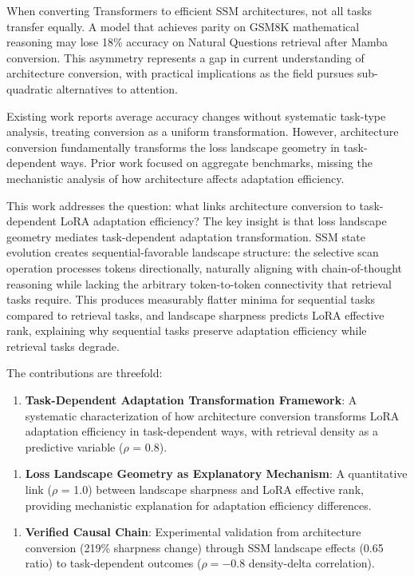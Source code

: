 
When converting Transformers to efficient SSM architectures, not all tasks transfer equally. A model that achieves parity on GSM8K mathematical reasoning may lose 18\% accuracy on Natural Questions retrieval after Mamba conversion. This asymmetry represents a gap in current understanding of architecture conversion, with practical implications as the field pursues sub-quadratic alternatives to attention.

Existing work reports average accuracy changes without systematic task-type analysis, treating conversion as a uniform transformation. However, architecture conversion fundamentally transforms the loss landscape geometry in task-dependent ways. Prior work focused on aggregate benchmarks, missing the mechanistic analysis of how architecture affects adaptation efficiency.

This work addresses the question: what links architecture conversion to task-dependent LoRA adaptation efficiency? The key insight is that loss landscape geometry mediates task-dependent adaptation transformation. SSM state evolution creates sequential-favorable landscape structure: the selective scan operation processes tokens directionally, naturally aligning with chain-of-thought reasoning while lacking the arbitrary token-to-token connectivity that retrieval tasks require. This produces measurably flatter minima for sequential tasks compared to retrieval tasks, and landscape sharpness predicts LoRA effective rank, explaining why sequential tasks preserve adaptation efficiency while retrieval tasks degrade.

The contributions are threefold:

\begin{enumerate}
\item \textbf{Task-Dependent Adaptation Transformation Framework}: A systematic characterization of how architecture conversion transforms LoRA adaptation efficiency in task-dependent ways, with retrieval density as a predictive variable ($\rho$ = 0.8).
\end{enumerate}

\begin{enumerate}
\item \textbf{Loss Landscape Geometry as Explanatory Mechanism}: A quantitative link ($\rho$ = 1.0) between landscape sharpness and LoRA effective rank, providing mechanistic explanation for adaptation efficiency differences.
\end{enumerate}

\begin{enumerate}
\item \textbf{Verified Causal Chain}: Experimental validation from architecture conversion (219\% sharpness change) through SSM landscape effects (0.65 ratio) to task-dependent outcomes ($\rho = -0.8$ density-delta correlation).
\end{enumerate}
